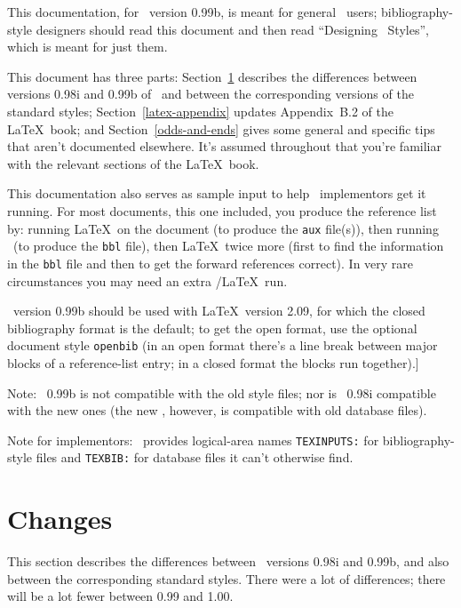 This documentation, for \BibTeX\ version 0.99b,
is meant for general \BibTeX\ users;
bibliography-style designers should read this document
and then read ``Designing \BibTeX\ Styles''\cite{btxhak},
which is meant for just them.

This document has three parts:
Section~\ref{differences}
describes the differences between versions 0.98i and 0.99b
of \BibTeX\ and between the corresponding versions of the standard styles;
Section~\ref{latex-appendix}
updates Appendix~B.2 of the \LaTeX\ book\cite{latex};
and Section~\ref{odds-and-ends}
gives some general and specific tips
that aren't documented elsewhere.
It's assumed throughout that you're familiar with
the relevant sections of the \LaTeX\ book.

This documentation also serves as sample input to help
\BibTeX\ implementors get it running.
For most documents, this one included, you produce the reference list by:
running \LaTeX\ on the document (to produce the {\tt aux} file(s)),
then running \BibTeX\ (to produce the {\tt bbl} file),
then \LaTeX\ twice more (first to find the information in the {\tt bbl} file
and then to get the forward references correct).
In very rare circumstances you may need an extra \BibTeX/\LaTeX\ run.

\BibTeX\ version 0.99b should be used with \LaTeX\ version 2.09,
for which the closed bibliography format is the default;
to get the open format, use the optional document style {\tt openbib}
(in an open format there's a line break between major blocks of a
reference-list entry; in a closed format the blocks run together).]

Note: \BibTeX\ 0.99b is not compatible with the old style files;
nor is \BibTeX\ 0.98i compatible with the new ones
(the new \BibTeX, however, is compatible with old database files).

Note for implementors: \BibTeX\ provides logical-area names
\hbox{\tt TEXINPUTS:} for bibliography-style files and
\hbox{\tt TEXBIB:} for database files it can't otherwise find.


\section{Changes}
\label{differences}

This section describes the differences between
\BibTeX\ versions 0.98i and 0.99b, and also between
the corresponding standard styles.
There were a lot of differences;
there will be a lot fewer between 0.99 and 1.00.


